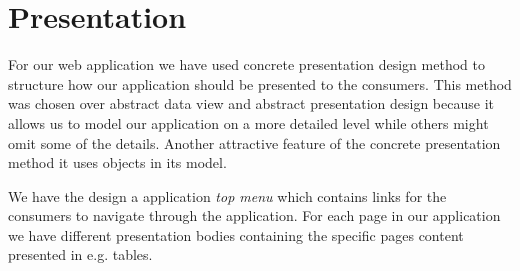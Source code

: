 \section{Presentation}
For our web application we have used concrete presentation design method to structure how our application should be presented to the consumers. This method was chosen over abstract data view and abstract presentation design because it allows us to model our application on a more detailed level while others might omit some of the details. Another attractive feature of the concrete presentation method it uses objects in its model.

We have the design a application \textit{top menu} which contains links for the consumers to navigate through the application. For each page in our application we have different presentation bodies containing the specific pages content presented in e.g. tables. 